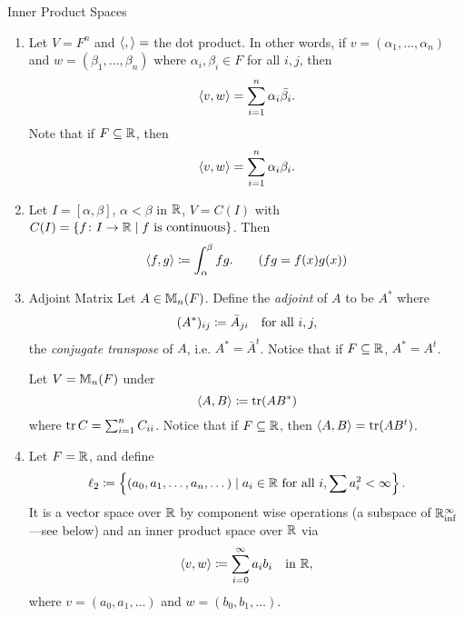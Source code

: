 \documentclass[class=article, crop=false]{standalone}
\begin{document}
  \begin{example}{Inner Product Spaces}
    \begin{enumerate}[label=(\alph*)]
      \item Let $V = F^n$ and $\left\langle , \right\rangle =$ the dot product. In other words, if $v = (\alpha_1,\dotsc,\alpha_n)$ and $w = (\beta_1,\dotsc,\beta_n)$ where $\alpha_i,\beta_i\in F$ for all $i, j$, then 
      \[
        \left\langle v, w \right\rangle = \sum_{i=1}^{n}\alpha_i \bar{\beta_i}.
      \]
      Note that if $F\subseteq \mathbb{R}$, then 
      \[
        \left\langle v, w \right\rangle = \sum_{i=1}^{n}\alpha_i \beta_i.
      \]
      \item Let $I = [\alpha, \beta]$, $\alpha < \beta$ in $\mathbb{R}$, $V = C(I)$ with $C(I) = \left\{f\colon I\to \mathbb{R}\mid f \text{ is continuous}\right\}$. Then 
      \[
        \left\langle f, g \right\rangle\coloneqq \int_{\alpha}^{\beta}fg. \tag{$fg = f(x)g(x)$}
      \]
      \item \phantom{}
      \begin{definition}{Adjoint Matrix}
        Let $A\in \mathbb{M}_n(F)$. Define the \emph{adjoint} of $A$ to be $A^*$ where
        \[
          (A^*)_{ij}\coloneqq \bar{A}_{ji} \quad\text{for all }i, j,
        \]
        the \emph{conjugate transpose} of $A$, i.e. $A^* = \bar{A}^t$. Notice that if $F\subseteq \mathbb{R}$, $A^* = A^t$.
      \end{definition}
      Let $V = \mathbb{M}_n(F)$ under
      \[
        \left\langle A, B \right\rangle\coloneqq \operatorname{tr}(AB^*)
      \]
      where $\operatorname{tr} C = \sum_{i=1}^{n}C_{ii}$. Notice that if $F\subseteq\mathbb{R}$, then $\left\langle A, B \right\rangle = \operatorname{tr}(AB^t)$.
      \item Let $F = \mathbb{R}$, and define
      \[
        \ell_2\coloneqq \left\{(a_0,a_1,\dotsc,a_n,\dotsc)\mid a_i\in\mathbb{R} \text{ for all }i, \sum a_i^2 < \infty\right\}.
      \]
      It is a vector space over $\mathbb{R}$ by component wise operations (a subspace of $\mathbb{R}^\infty_{\text{inf}}$---see below) and an inner product space over $\mathbb{R}$ via
      \[
        \left\langle v, w \right\rangle\coloneqq \sum_{i=0}^{\infty}a_ib_i \quad \text{in }\mathbb{R},
      \]
      where $v = (a_0,a_1,\dotsc)$ and $w = (b_0,b_1,\dotsc)$.
    \end{enumerate}
  \end{example}
\end{document}
